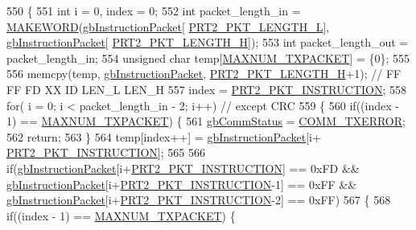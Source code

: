 \begin{DoxyCode}
550 \{
551     \textcolor{keywordtype}{int} i = 0, index = 0;
552     \textcolor{keywordtype}{int} packet\_length\_in = \hyperlink{dynamixel_8h_a6b98c16b8e3e7733dd4063d0b0fac24c}{MAKEWORD}(\hyperlink{classdynamixel2_a298efe9115fdbf77019af1001e801fb4}{gbInstructionPacket}[
      \hyperlink{dynamixel_8h_a9e77ab568957b64786c810967dec8b0c}{PRT2\_PKT\_LENGTH\_L}], \hyperlink{classdynamixel2_a298efe9115fdbf77019af1001e801fb4}{gbInstructionPacket}[
      \hyperlink{dynamixel_8h_a5ea18a21d722bf72217d5408c4d2a868}{PRT2\_PKT\_LENGTH\_H}]);
553     \textcolor{keywordtype}{int} packet\_length\_out = packet\_length\_in;
554     \textcolor{keywordtype}{unsigned} \textcolor{keywordtype}{char} temp[\hyperlink{dxl__hal_8h_ad753363487043da5d9fdd3fd1071f59e}{MAXNUM\_TXPACKET}] = \{0\};
555 
556     memcpy(temp, \hyperlink{classdynamixel2_a298efe9115fdbf77019af1001e801fb4}{gbInstructionPacket}, \hyperlink{dynamixel_8h_a5ea18a21d722bf72217d5408c4d2a868}{PRT2\_PKT\_LENGTH\_H}+1);    \textcolor{comment}{// FF FF
       FD XX ID LEN\_L LEN\_H}
557     index = \hyperlink{dynamixel_8h_aece9dd9d7c0fa1714d53c568865d79ad}{PRT2\_PKT\_INSTRUCTION};
558     \textcolor{keywordflow}{for}( i = 0; i < packet\_length\_in - 2; i++)  \textcolor{comment}{// except CRC}
559     \{
560         \textcolor{keywordflow}{if}((index - 1) == \hyperlink{dxl__hal_8h_ad753363487043da5d9fdd3fd1071f59e}{MAXNUM\_TXPACKET}) \{
561             \hyperlink{classdynamixel2_a703e327ba8ec5909c238dc94a00cb32d}{gbCommStatus} = \hyperlink{dynamixel_8h_a1bd7c7b30db4f56dc80cef65ad38afff}{COMM\_TXERROR};
562             \textcolor{keywordflow}{return};
563         \}
564         temp[index++] = \hyperlink{classdynamixel2_a298efe9115fdbf77019af1001e801fb4}{gbInstructionPacket}[i+
      \hyperlink{dynamixel_8h_aece9dd9d7c0fa1714d53c568865d79ad}{PRT2\_PKT\_INSTRUCTION}];
565 
566         \textcolor{keywordflow}{if}(\hyperlink{classdynamixel2_a298efe9115fdbf77019af1001e801fb4}{gbInstructionPacket}[i+\hyperlink{dynamixel_8h_aece9dd9d7c0fa1714d53c568865d79ad}{PRT2\_PKT\_INSTRUCTION}] == 0xFD && 
      \hyperlink{classdynamixel2_a298efe9115fdbf77019af1001e801fb4}{gbInstructionPacket}[i+\hyperlink{dynamixel_8h_aece9dd9d7c0fa1714d53c568865d79ad}{PRT2\_PKT\_INSTRUCTION}-1] == 0xFF && 
      \hyperlink{classdynamixel2_a298efe9115fdbf77019af1001e801fb4}{gbInstructionPacket}[i+\hyperlink{dynamixel_8h_aece9dd9d7c0fa1714d53c568865d79ad}{PRT2\_PKT\_INSTRUCTION}-2] == 0xFF)
567         \{   
568             \textcolor{keywordflow}{if}((index - 1) == \hyperlink{dxl__hal_8h_ad753363487043da5d9fdd3fd1071f59e}{MAXNUM\_TXPACKET}) \{

\end{DoxyCode}
